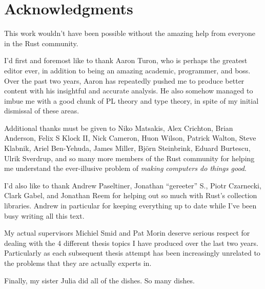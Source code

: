 {}


\bigskip

\begingroup
\let\clearpage\relax
\let\cleardoublepage\relax
\let\cleardoublepage\relax
\chapter*{Acknowledgments}

This work wouldn't have been possible without the amazing help from everyone in
the Rust community.

I'd first and foremost like to thank Aaron Turon, who is perhaps the greatest
editor ever, in addition to being an amazing academic, programmer, and boss.
Over the past two years, Aaron has repeatedly pushed me to produce better content
with his insightful and accurate analysis. He also somehow managed to imbue me with
a good chunk of PL theory and type theory, in spite of my initial dismissal of these
areas.

Additional thanks must be given to Niko Matsakis, Alex Crichton, Brian Anderson,
Felix S Klock II, Nick Cameron, Huon Wilson, Patrick Walton, Steve Klabnik, Ariel Ben-Yehuda,
James Miller, Björn Steinbrink, Eduard Burtescu, Ulrik Sverdrup, and so many more members of the
Rust community for helping me understand the ever-illusive problem of
\emph{making computers do things good}.

I'd also like to thank Andrew Paseltiner, Jonathan ``gereeter'' S., Piotr Czarnecki,
Clark Gabel, and Jonathan Reem for helping out so much with Rust's collection
libraries. Andrew in particular for keeping everything up to date while I've been
busy writing all this text.

My actual supervisors Michiel Smid and Pat Morin deserve serious respect for
dealing with the 4 different thesis topics I have produced over the last
two years. Particularly as each subsequent thesis attempt has been increasingly
unrelated to the problems that they are actually experts in.

Finally, my sister Julia did all of the dishes. So many dishes.


\endgroup



